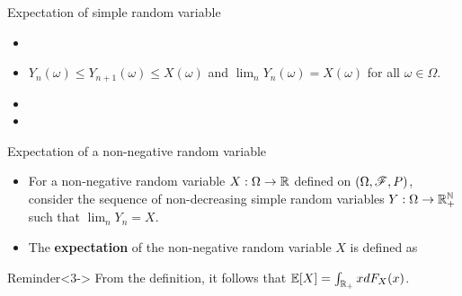 \documentclass[12pt,aspectratio=169]{beamer}
\begin{document}
\begin{frame}{Expectation of simple random variable}
\begin{Proof}
\begin{itemize}
\item <1-> 
\item <2-> $Y_n(\omega) \le Y_{n+1}(\omega) \le X(\omega)$ and $\lim_nY_n(\omega) = X(\omega)$ for all $\omega \in \Omega$. 
\item <3-> 
\item <4->
\end{itemize}
\end{Proof}
\end{frame}

\begin{frame}{Expectation of a non-negative random variable}
\begin{Definition}
\begin{itemize}
\item <1-> For a non-negative random variable $X: \Omega \to \mathbb{R}$ defined on $(\Omega,\mathscr{F},P)$, 
consider the sequence of non-decreasing simple random variables $Y: \Omega \to \mathbb{R}_+^{\mathbb{N}}$ such that $\lim_nY_n = X$. 
\item <2-> The \textbf{expectation} of the non-negative random variable $X$ is defined as 
\end{itemize}
\end{Definition}
\begin{block}{Reminder}<3->
From the definition, it follows that $\mathbb{E}[X] = \int_{\mathbb{R}_+} x dF_X(x)$. 
\end{block}
\end{frame}
\end{document}
